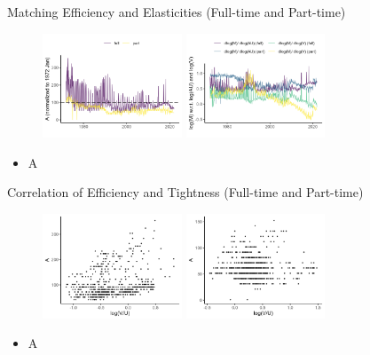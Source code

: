 \documentclass[aspectratio=169]{beamer}
\begin{document}
\begin{frame}{Matching Efficiency and Elasticities (Full-time and Part-time)}
    \begin{figure}[!ht]
  \begin{center}
  \includegraphics[width = 0.37\textwidth]
  {figuretable/matching_efficiency_month_full_time_part_time.png}
  \includegraphics[width = 0.37\textwidth]
  {figuretable/elasticity_month_full_time_part_time.png}
  \end{center}
  \footnotesize
\end{figure} 

\begin{itemize}
    \item A
\end{itemize}
\end{frame}

\begin{frame}{Correlation of Efficiency and Tightness (Full-time and Part-time)}
    
\begin{figure}[!ht]
  \begin{center}
  \includegraphics[width = 0.37\textwidth]
  {figuretable/efficiency_tightness_plot_month_full_time.png}
  \includegraphics[width = 0.37\textwidth]
  {figuretable/efficiency_tightness_plot_month_part_time.png}
  \end{center}
  \footnotesize
\end{figure} 
\begin{itemize}
    \item A
\end{itemize}
\end{frame}
\end{document}

